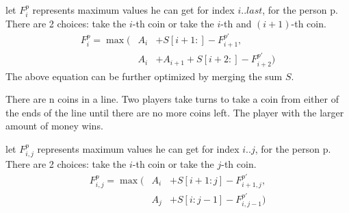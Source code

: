 let $F_i^p$ represents maximum values he can get for index $i..last$, for the person p. There are 2 choices: take the $i$-th coin or take the $i$-th and $(i+1)$-th coin.
\begin{eqnarray*}
F_i^p = \max\big(&A_i&+S[i+1:]-F_{i+1}^{p'},  \\
&A_i&+A_{i+1}+S[i+2:]-F_{i+2}^{p'}\big)
\end{eqnarray*}
The above equation can be further optimized by merging the sum $S$.

There are n coins in a line. Two players take turns to take a coin from either of the ends of the line until there are no more coins left. The player with the larger amount of money wins.

let $F_{i, j}^p$ represents maximum values he can get for index $i..j$, for
the person p. There are 2 choices: take the $i$-th coin or take the $j$-th coin.
\begin{eqnarray*}
F_{i,j}^p = \max\big(&A_i&+S[i+1:j]-F_{i+1,j}^{p'},  \\
&A_j&+S[i:j-1]-F_{i,j-1}^{p'}\big)
\end{eqnarray*}

